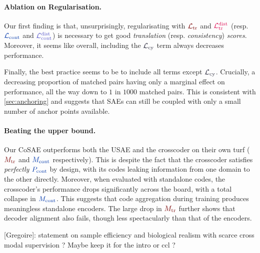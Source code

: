 \documentclass{article}
\newcommand{\greg}[1]{{\color{indigo}[Gregoire]: #1}}
\begin{document}
\paragraph{Ablation on Regularisation.}
Our first finding is that, unsurprisingly, regularisating with $\Ltr$ and $\Ltrdist$ (resp. $\Lcont$ and $\Lcontdist$) is necessary to get good \emph{translation} (resp. \emph{consistency}) \emph{scores}. Moreover, it seems like overall, including the $\Lcy$ term always decreases performance.

Finally, the best practice seems to be to include all terms except $\Lcy$. Crucially, a decreasing proportion of matched pairs having only a marginal effect on performance, all the way down to $1$ in $1000$ matched pairs. This is consistent with \cref{sec:anchoring} and suggests that SAEs can still be coupled with only a small number of anchor points available.

\paragraph{Beating the upper bound.}
Our CoSAE outperforms both the USAE and the crosscoder on their own turf ($\Mtr$ and $\Mcont$ respectively). This is despite the fact that the crosscoder satisfies \emph{perfectly} $\Pcont$ by design, with its codes leaking information from one domain to the other directly. Moreover, when evaluated with standalone codes, the crosscoder's performance drops significantly across the board, with a total collapse in $\Mcont$. This suggests that code aggregation during training produces meaningless standalone encoders. The large drop in $\Mtr$ further shows that decoder alignment also fails, though less spectacularly than that of the encoders.

\greg{statement on sample efficiency and biological realism with scarce cross modal supervision ? Maybe keep it for the intro or ccl ?}

\begin{table}[h]
  \centering
  \caption{Our method outperforms both crosscoders and USAE.}
  \label{tab:recipe}
\end{table}
\end{document}

